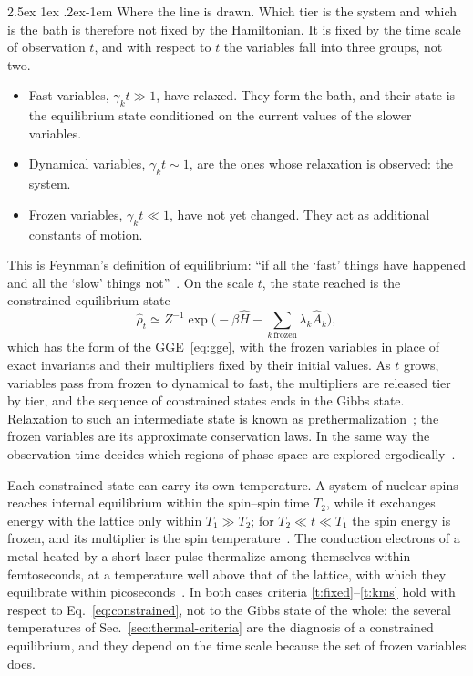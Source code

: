 \documentclass[10pt,a4paper]{article}
\makeatletter
\renewcommand{\paragraph}{\@startsection{paragraph}{4}{\z@}%
  {2.5ex \@plus 1ex \@minus .2ex}{-1em}%
  {\normalfont\fontsize{14pt}{17pt}\selectfont\bfseries}}
\makeatother
\begin{document}
\paragraph{Where the line is drawn.}
Which tier is the system and which is the bath is therefore not fixed by the Hamiltonian.
It is fixed by the time scale of observation $ t $, and with respect to $ t $ the variables fall into three groups, not two.
\begin{itemize}[leftmargin=1.5em]
\item Fast variables, $ \gamma_k t \gg 1 $, have relaxed. They form the bath, and their state is the equilibrium state conditioned on the current values of the slower variables.
\item Dynamical variables, $ \gamma_k t \sim 1 $, are the ones whose relaxation is observed: the system.
\item Frozen variables, $ \gamma_k t \ll 1 $, have not yet changed. They act as additional constants of motion.
\end{itemize}
This is Feynman's definition of equilibrium: ``if all the `fast' things have happened and all the `slow' things not''~\cite{Feynman1972}.
On the scale $ t $, the state reached is the constrained equilibrium state
\begin{equation}
  \hat\rho_t \simeq Z^{-1} \exp\Big( - \beta \hat H - \sum_{k\,\text{frozen}} \lambda_k \hat A_k \Big) ,
  \label{eq:constrained}
\end{equation}
which has the form of the GGE~\eqref{eq:gge}, with the frozen variables in place of exact invariants and their multipliers fixed by their initial values.
As $ t $ grows, variables pass from frozen to dynamical to fast, the multipliers are released tier by tier, and the sequence of constrained states ends in the Gibbs state.
Relaxation to such an intermediate state is known as prethermalization~\cite{Berges2004,Kollar2011,Mori2018}; the frozen variables are its approximate conservation laws.
In the same way the observation time decides which regions of phase space are explored ergodically~\cite{Palmer1982}.

Each constrained state can carry its own temperature.
A system of nuclear spins reaches internal equilibrium within the spin--spin time $ T_2 $, while it exchanges energy with the lattice only within $ T_1 \gg T_2 $; for $ T_2 \ll t \ll T_1 $ the spin energy is frozen, and its multiplier is the spin temperature~\cite{AbragamProctor1958}.
The conduction electrons of a metal heated by a short laser pulse thermalize among themselves within femtoseconds, at a temperature well above that of the lattice, with which they equilibrate within picoseconds~\cite{Anisimov1974}.
In both cases criteria \ref{t:fixed}--\ref{t:kms} hold with respect to Eq.~\eqref{eq:constrained}, not to the Gibbs state of the whole: the several temperatures of Sec.~\ref{sec:thermal-criteria} are the diagnosis of a constrained equilibrium, and they depend on the time scale because the set of frozen variables does.
\end{document}
